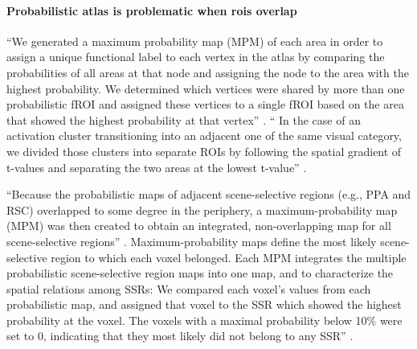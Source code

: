 \paragraph{Probabilistic atlas is problematic when \acp{roi} overlap}
%
``We generated a maximum probability map (MPM) of each area in order to assign a
unique functional label to each vertex in the atlas by comparing the
probabilities of all areas at that node and assigning the node to the area with
the highest probability.
%
We determined which vertices were shared by more than one probabilistic fROI and
assigned these vertices to a single fROI based on the area that showed the
highest probability at that vertex'' \citep{rosenke2021probabilistic}.
%
``
In the case of an activation cluster transitioning into an adjacent one of the
same visual category, we divided those clusters into separate ROIs by following
the spatial gradient of t-values and separating the two areas at the lowest
t-value'' \citep{rosenke2021probabilistic}.


%
``Because the probabilistic maps of adjacent scene-selective regions (e.g., PPA
and RSC) overlapped to some degree in the periphery, a maximum-probability map
(MPM) was then created to obtain an integrated, non-overlapping map for all
scene-selective regions'' \citep{zhen2017quantifying}.
%
Maximum-probability maps define the most likely scene-selective region to
which each voxel belonged.
%
Each MPM integrates the multiple probabilistic scene-selective region maps into
one map, and to characterize the spatial relations among SSRs:
%
We compared each voxel's values from each probabilistic map, and assigned that
voxel to the SSR which showed the highest probability at the voxel.
%
The voxels with a maximal probability below 10\% were set to 0, indicating that
they most likely did not belong to any SSR'' \citep{zhen2017quantifying}.


